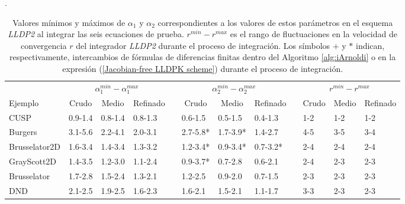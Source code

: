 .


\begin{table}
	\caption{Valores mínimos y máximos de $\alpha _{1}$ y $\alpha _{2}$ correspondientes a los valores de estos parámetros en el esquema \emph{LLDP2} al integrar las seis ecuaciones de prueba. $r^{min}-r^{max}$ es el rango de fluctuaciones en la velocidad de convergencia $r$ del integrador \emph{LLDP2} durante el proceso de integración. Los símbolos $+$ y $*$ indican, respectivamente, intercambios de fórmulas de diferencias finitas dentro del Algoritmo \ref{alg:iArnoldi} o en la expresión (\ref{Jacobian-free LLDPK scheme}) durante el proceso de integración.}
	\label{tab:R_LLDP2}
	\begin{adjustbox}{width=0.95\columnwidth,center}
		\begin{tabular}{lccccccccccc}
			& \multicolumn{3}{c}{$\alpha^{min}_{1}-\alpha^{max}_{1}$} &  & \multicolumn{3}{c}{$\alpha^{min}_{2}-\alpha^{max}_{2}$} &  & \multicolumn{3}{c}{$r^{min}-r^{max}$} \\
			\cline{2-4}\cline{6-8}\cline{10-12} Ejemplo & Crudo & Medio & Refinado &  & Crudo & Medio & Refinado &  & Crudo & Medio & Refinado \\
			\hline
			CUSP & \multicolumn{1}{l}{0.9-1.4} & \multicolumn{1}{l}{0.8-1.4} & \multicolumn{1}{l}{0.8-1.3} &  & \multicolumn{1}{l}{0.6-1.5} & \multicolumn{1}{l}{0.5-1.5} & \multicolumn{1}{l}{0.4-1.3} &  & \multicolumn{1}{l}{1-2} & \multicolumn{1}{l}{1-2} & \multicolumn{1}{l}{1-2} \\
			Burgers & \multicolumn{1}{l}{3.1-5.6} & \multicolumn{1}{l}{2.2-4.1} & \multicolumn{1}{l}{2.0-3.1} &  & \multicolumn{1}{l}{2.7-5.8*} & \multicolumn{1}{l}{1.7-3.9*} & \multicolumn{1}{l}{1.4-2.7} &  & \multicolumn{1}{l}{4-5} & \multicolumn{1}{l}{3-5} & \multicolumn{1}{l}{3-4} \\
			Brusselator2D & \multicolumn{1}{l}{1.6-3.4} & \multicolumn{1}{l}{1.4-3.4} & \multicolumn{1}{l}{1.3-3.2} &  & \multicolumn{1}{l}{1.2-3.4*} & \multicolumn{1}{l}{0.9-3.4*} & \multicolumn{1}{l}{0.7-3.2*} &  & \multicolumn{1}{l}{2-4} & \multicolumn{1}{l}{2-4} & \multicolumn{1}{l}{2-4} \\
			GrayScott2D & \multicolumn{1}{l}{1.4-3.5} & \multicolumn{1}{l}{1.2-3.0} & \multicolumn{1}{l}{1.1-2.4} &  & \multicolumn{1}{l}{0.9-3.7*} & \multicolumn{1}{l}{0.7-2.8} & \multicolumn{1}{l}{0.6-2.1} &  & \multicolumn{1}{l}{2-4} & \multicolumn{1}{l}{2-3} & \multicolumn{1}{l}{2-3} \\
			Brusselator & \multicolumn{1}{l}{1.7-2.8} & \multicolumn{1}{l}{1.5-2.4} & \multicolumn{1}{l}{1.3-2.1} &  & \multicolumn{1}{l}{1.2-2.5} & \multicolumn{1}{l}{0.9-2.0} & \multicolumn{1}{l}{0.7-1.5} &  & \multicolumn{1}{l}{2-3} & \multicolumn{1}{l}{2-3} & \multicolumn{1}{l}{2-3} \\
			DND & \multicolumn{1}{l}{2.1-2.5} & \multicolumn{1}{l}{1.9-2.5} & \multicolumn{1}{l}{1.6-2.3} &  & \multicolumn{1}{l}{1.6-2.1} & \multicolumn{1}{l}{1.5-2.1} & \multicolumn{1}{l}{1.1-1.7} &  & \multicolumn{1}{l}{3-3} & \multicolumn{1}{l}{2-3} & \multicolumn{1}{l}{2-3} \\
			\hline
		\end{tabular}
	\end{adjustbox}
\end{table}